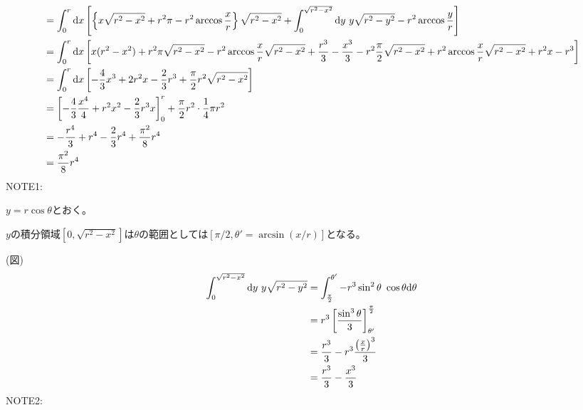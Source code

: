 \documentclass[letterpaper,10pt,english]{sphinxmanual}
\begin{document}
\begin{gather}
\begin{split}
\begin{align}
&= \int^{r}_{0}\mathrm{d}x\left[ \left\{ x\sqrt{r^{2}-x^{2}} + r^{2}\pi -r^{2}\arccos\frac{x}{r} \right\}\sqrt{r^{2}-x^{2}} + \int^{\sqrt{r^{2}-x^{2}}}_{0}\mathrm{d}y\ y\sqrt{r^{2}-y^{2}} -r^{2}\arccos\frac{y}{r}\right]\\
&= \int^{r}_{0}\mathrm{d}x\left[ x(r^{2}-x^{2}) + r^{2}\pi\sqrt{r^{2}-x^{2}} -r^{2}\arccos \frac{x}{r} \sqrt{r^{2}-x^{2}} + \frac{r^{3}}{3} - \frac{x^{3}}{3} - r^{2}\frac{\pi}{2}\sqrt{r^{2}-x^{2}} + r^{2}\arccos\frac{x}{r}\sqrt{r^{2}-x^{2}} +r^{2}x - r^{3}\right] \\
&= \int^{r}_{0}\mathrm{d}x \left[-\frac{4}{3}x^{3} + 2r^{2}x - \frac{2}{3}r^{3} + \frac{\pi}{2}r^{2}\sqrt{r^{2}-x^{2}} \right]\\
&= \left[ -\frac{4}{3}\frac{x^{4}}{4} + r^{2}x^{2} - \frac{2}{3}r^{3}x \right]^{r}_{0} + \frac{\pi}{2}r^{2}\cdot \frac{1}{4}\pi r^{2}\\
&= -\frac{r^{4}}{3} + r^{4} -\frac{2}{3}r^{4} + \frac{\pi ^{2}}{8}r^{4}\\
&= \frac{\pi^{2}}{8}r^{4}
\end{align}\end{split}\notag
\end{gather}
NOTE1:

\(y=r\cos \theta\)とおく。

\(y\)の積分領域\([0, \sqrt{r^{2}-x^{2}}]\)は\(\theta\)の範囲としては\([\pi/2, \theta' = \arcsin(x/r)]\)となる。

(図)
\begin{gather}
\begin{split}\begin{align}
\int^{\sqrt{r^{2}-x^{2}}}_{0}\mathrm{d}y\ y\sqrt{r^{2}-y^{2}} &= \int^{\theta'}_{\frac{\pi}{2}}-r^{3}\sin^{2}\theta\ \cos\theta \mathrm{d}\theta\\
&= r^{3}\left[ \frac{\sin^{3}\theta}{3} \right]^{\frac{\pi}{2}}_{\theta'}\\
&= \frac{r^{3}}{3} - r^{3}\frac{\left( \frac{x}{r} \right)^{3}}{3}\\
&= \frac{r^{3}}{3} - \frac{x^{3}}{3}
\end{align}\end{split}\notag
\end{gather}
NOTE2:
\end{document}

